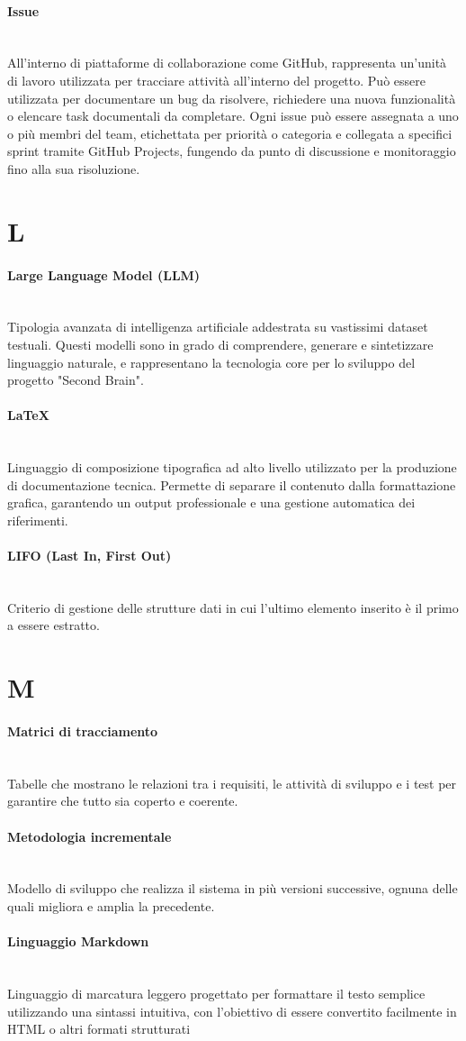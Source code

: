 \documentclass[a4paper, 10pt, colorlinks=true, linkcolor=black, urlcolor=blue, citecolor=blue, hidelinks]{article}
\newcommand{\glossaryterm}[2]{
    \paragraph{#1 \label{term:#1}} \mbox{} \\
    #2
    \vspace{0.5em}
}
\begin{document}
\glossaryterm{Issue}{All'interno di piattaforme di collaborazione come GitHub, rappresenta un'unità di lavoro utilizzata per tracciare attività all'interno del progetto. Può essere utilizzata per documentare un bug da risolvere, richiedere una nuova funzionalità o elencare task documentali da completare. Ogni issue può essere assegnata a uno o più membri del team, etichettata per priorità o categoria e collegata a specifici sprint tramite GitHub Projects, fungendo da punto di discussione e monitoraggio fino alla sua risoluzione.}

\newpage

\section*{L}

\glossaryterm{Large Language Model (LLM)}{Tipologia avanzata di intelligenza artificiale addestrata su vastissimi dataset testuali. Questi modelli sono in grado di comprendere, generare e sintetizzare linguaggio naturale, e rappresentano la tecnologia core per lo sviluppo del progetto "Second Brain".}

\glossaryterm{LaTeX}{Linguaggio di composizione tipografica ad alto livello utilizzato per la produzione di documentazione tecnica. Permette di separare il contenuto dalla formattazione grafica, garantendo un output professionale e una gestione automatica dei riferimenti.}

\glossaryterm{LIFO (Last In, First Out)}{Criterio di gestione delle strutture dati in cui l'ultimo elemento inserito è il primo a essere estratto.}

\newpage

\section*{M}

\glossaryterm{Matrici di tracciamento}{Tabelle che mostrano le relazioni tra i requisiti, le attività di sviluppo e i test per garantire che tutto sia coperto e coerente.}

\glossaryterm{Metodologia incrementale}{Modello di sviluppo che realizza il sistema in più versioni successive, ognuna delle quali migliora e amplia la precedente.}

\glossaryterm{Linguaggio Markdown}{Linguaggio di marcatura leggero progettato per formattare il testo semplice utilizzando una sintassi intuitiva, con l’obiettivo di essere convertito facilmente in HTML o altri formati strutturati}
\end{document}
